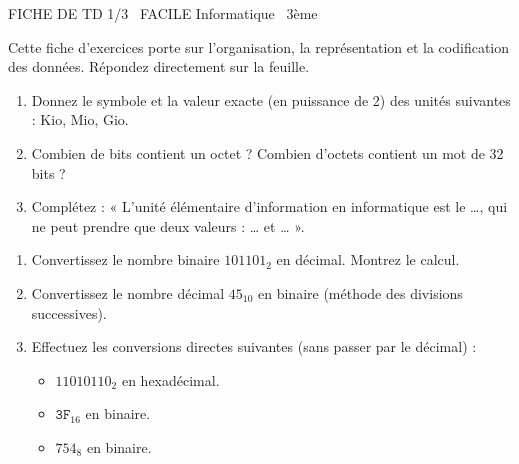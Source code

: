 \documentclass[11pt]{article}
\begin{document}
\begin{tcolorbox}[enhanced,colback=popink,colframe=popink,arc=10pt,boxrule=0pt,left=12pt,right=12pt,top=9pt,bottom=9pt]
{\color{white}\popxbold\small FICHE DE TD 1/3 \textbullet\ FACILE \hfill Informatique \textbullet\ 3ème\par}
\end{tcolorbox}
\vspace{4pt}
\noindent Cette fiche d'exercices porte sur l'organisation, la représentation et la codification des données. Répondez directement sur la feuille.

\begin{exercice}
\begin{enumerate}
    \item Donnez le symbole et la valeur exacte (en puissance de 2) des unités suivantes : Kio, Mio, Gio.
    \item Combien de bits contient un octet ? Combien d'octets contient un mot de 32 bits ?
    \item Complétez : « L'unité élémentaire d'information en informatique est le \ldots{}, qui ne peut prendre que deux valeurs : \ldots{} et \ldots{} ».
\end{enumerate}
\end{exercice}

\begin{exercice}
\begin{enumerate}
    \item Convertissez le nombre binaire $101101_2$ en décimal. Montrez le calcul.
    \item Convertissez le nombre décimal $45_{10}$ en binaire (méthode des divisions successives).
    \item Effectuez les conversions directes suivantes (sans passer par le décimal) :
    \begin{itemize}
        \item $11010110_2$ en hexadécimal.
        \item $\mathtt{3F}_{16}$ en binaire.
        \item $754_8$ en binaire.
    \end{itemize}
\end{enumerate}
\end{exercice}
\end{document}
